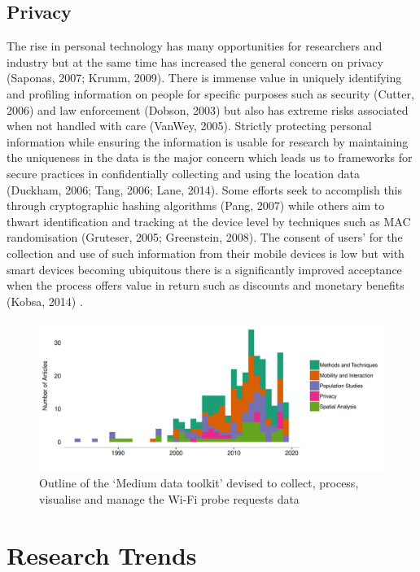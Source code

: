 \subsection{Privacy}
The rise in personal technology has many opportunities for researchers and industry but at the same time has increased the general concern on privacy (Saponas, 2007; Krumm, 2009).
There is immense value in uniquely identifying and profiling information on people for specific purposes such as security (Cutter, 2006) and law enforcement (Dobson, 2003) but also has extreme risks associated when not handled with care (VanWey, 2005).
Strictly protecting personal information while ensuring the information is usable for research by maintaining the uniqueness in the data is the major concern which leads us to frameworks for secure practices in confidentially collecting and using the location data (Duckham, 2006; Tang, 2006; Lane, 2014).
Some efforts seek to accomplish this through cryptographic hashing algorithms (Pang, 2007) while others aim to thwart identification and tracking at the device level by techniques such as MAC randomisation (Gruteser, 2005; Greenstein, 2008).
The consent of users’ for the collection and use of such information from their mobile devices is low but with smart devices becoming ubiquitous there is a significantly improved acceptance when the process offers value in return such as discounts and monetary benefits (Kobsa, 2014) .

\begin{figure}
  \includegraphics{images/literature-themes-timeline.png}
  \caption{Outline of the `Medium data toolkit' devised to collect, process, visualise and manage the Wi-Fi probe requests data}
  \label{figure:literature:themes:timeline}
\end{figure}

\section{Research Trends}

